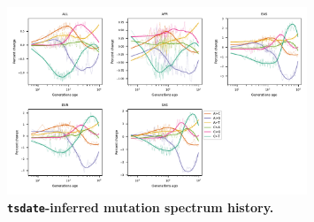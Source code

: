 \documentclass[]{article}
\begin{document}
\begin{figure}[ht!]
    \centering
    \includegraphics[width=0.8\textwidth]{../plots/spectrum_history.tsdate.max_age.10000.pdf}
    \caption{
        \textbf{\texttt{tsdate}-inferred mutation spectrum history.}
    }
    \label{fig:tsdate-spectra}
\end{figure}

\break



\end{document}
